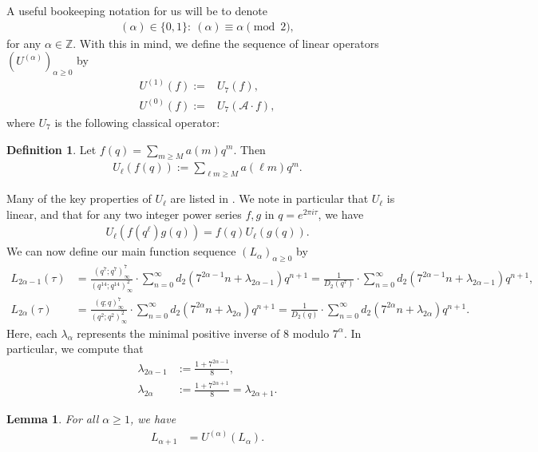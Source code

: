 \documentclass[reqno]{amsart}
\newtheorem{lemma}[theorem]{Lemma}
\theoremstyle{definition}
\newtheorem{definition}[theorem]{Definition}
\theoremstyle{remark}
\numberwithin{equation}{section}
\begin{document}
A useful bookeeping notation for us will be to denote
\begin{align*}
(\alpha)\in\{0,1\}:\ (\alpha)\equiv \alpha\pmod{2},
\end{align*} for any $\alpha\in\mathbb{Z}$.  With this in mind, we define the sequence of linear operators $\left( U^{(\alpha)} \right)_{\alpha\ge 0}$ by
\begin{align*}
U^{(1)}(f) :=& U_7(f),\\
U^{(0)}(f) :=& U_7(\mathcal{A}\cdot f),
\end{align*} where $U_7$ is the following classical operator:
\begin{definition}
Let $f(q) = \sum_{m\ge M}a(m)q^m$.  Then
\begin{align*}
U_{\ell}\left(f(q)\right) := \sum_{\ell m\ge M} a(\ell m)q^m.
\end{align*}
\end{definition}
Many of the key properties of $U_{\ell}$ are listed in \cite[Chapter 8]{Knopp}.  We note in particular that $U_{\ell}$ is linear, and that for any two integer power series $f,g$ in $q=e^{2\pi i\tau}$, we have
\begin{align}
U_{\ell}\left(f(q^{\ell})g(q)\right) = f(q) U_{\ell}\left(g(q)\right).\label{ufgreduceA}
\end{align}
We can now define our main function sequence $\left( L_{\alpha} \right)_{\alpha\ge 0}$  %
by
\begin{align*}
L_{2\alpha-1}(\tau) &= \frac{(q^7;q^7)^{7}_{\infty}}{(q^{14};q^{14})^2_{\infty}}\cdot\sum_{n=0}^{\infty} d_2(7^{2\alpha-1}n + \lambda_{2\alpha-1})q^{n+1} = \frac{1}{D_2(q^7)}\cdot\sum_{n=0}^{\infty} d_2(7^{2\alpha-1}n + \lambda_{2\alpha-1})q^{n+1},\\
L_{2\alpha}(\tau) &= \frac{(q;q)^{7}_{\infty}}{(q^2;q^2)^2_{\infty}}\cdot\sum_{n=0}^{\infty} d_2(7^{2\alpha}n + \lambda_{2\alpha})q^{n+1} =\frac{1}{D_2(q)}\cdot\sum_{n=0}^{\infty} d_2(7^{2\alpha}n + \lambda_{2\alpha})q^{n+1}.
\end{align*}  Here, each $\lambda_{\alpha}$ represents the minimal positive inverse of 8 modulo $7^{\alpha}$.  In particular, we compute that
\begin{align*}
\lambda_{2\alpha-1} &:= \frac{1+7^{2\alpha-1}}{8},\\
\lambda_{2\alpha} &:= \frac{1+7^{2\alpha+1}}{8} = \lambda_{2\alpha+1}.
\end{align*}

\begin{lemma}
For all $\alpha\ge 1$, we have
\begin{align*}
L_{\alpha+1} &= U^{(\alpha)}\left( L_{\alpha} \right).
\end{align*}
\end{lemma}
\end{document}
